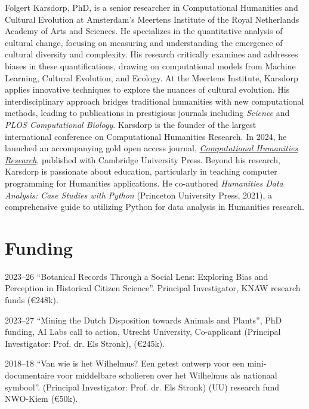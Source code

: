 \documentclass[12pt,letterpaper]{report}
\begin{document}
Folgert Karsdorp, PhD, is a senior researcher in Computational Humanities and
Cultural Evolution at Amsterdam’s Meertens Institute of the Royal Netherlands
Academy of Arts and Sciences. He specializes in the quantitative analysis of
cultural change, focusing on measuring and understanding the emergence of
cultural diversity and complexity. His research critically examines and
addresses biases in these quantifications, drawing on computational models from
Machine Learning, Cultural Evolution, and Ecology. At the Meertens Institute,
Karsdorp applies innovative techniques to explore the nuances of cultural
evolution. His interdisciplinary approach bridges traditional humanities with
new computational methods, leading to publications in prestigious journals
including \emph{Science} and \emph{PLOS Computational Biology}. Karsdorp is the
founder of the largest international conference on Computational Humanities
Research. In 2024, he launched an accompanying gold open access journal,
\emph{\href{https://www.cambridge.org/core/journals/computational-humanities-research}{Computational
    Humanities Research}}, published with Cambridge University Press. Beyond his
research, Karsdorp is passionate about education, particularly in teaching
computer programming for Humanities applications. He co-authored
\emph{Humanities Data Analysis: Case Studies with Python} (Princeton University
Press, 2021), a comprehensive guide to utilizing Python for data analysis in
Humanities research.

\nocite{*}
\printbibliography[title=Publications, heading=subbibliography]

\section*{Funding}
\begin{tablist}
\item[2023--26] \tab{}``Botanical Records Through a Social Lens: Exploring Bias
  and Perception in Historical Citizen Science''. Principal Investigator, KNAW
  research funds (€248k).
  \item[2023--27] \tab{}``Mining the Dutch Disposition towards Animals and
    Plants'', PhD funding, AI Labs call to action, Utrecht University,
    Co-applicant (Principal Investigator: Prof. dr. Els Stronk), (€245k).
  \item[2018--18] \tab{}``Van wie is het Wilhelmus? Een getest ontwerp voor een
    mini-documentaire voor middelbare scholieren over het Wilhelmus als
    nationaal symbool''. (Principal Investigator: Prof. dr. Els Stronk) (UU)
    research fund NWO-Kiem (€50k).
\end{tablist}
\end{document}
